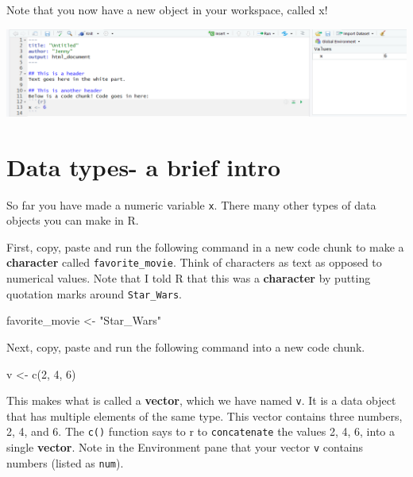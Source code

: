 \documentclass[
]{article}
\newenvironment{Shaded}{\begin{snugshade}}{\end{snugshade}}
\newcommand{\DecValTok}[1]{\textcolor[rgb]{0.00,0.00,0.81}{#1}}
\newcommand{\FunctionTok}[1]{\textcolor[rgb]{0.00,0.00,0.00}{#1}}
\newcommand{\NormalTok}[1]{#1}
\newcommand{\OtherTok}[1]{\textcolor[rgb]{0.56,0.35,0.01}{#1}}
\newcommand{\StringTok}[1]{\textcolor[rgb]{0.31,0.60,0.02}{#1}}
\begin{document}
\leavevmode\hypertarget{license}{}%
Note that you now have a new object in your workspace, called x!

\includegraphics[width=1\textwidth,height=\textheight]{figures/workspacex.png}

\hypertarget{data-types--a-brief-intro}{%
\section{Data types- a brief intro}\label{data-types--a-brief-intro}}

So far you have made a numeric variable \texttt{x}. There many other
types of data objects you can make in R.

First, copy, paste and run the following command in a new code chunk to
make a \textbf{character} called \texttt{favorite\_movie}. Think of
characters as text as opposed to numerical values. Note that I told R
that this was a \textbf{character} by putting quotation marks around
\texttt{Star\_Wars}.

\begin{Shaded}
\begin{Highlighting}[]
\NormalTok{favorite\_movie }\OtherTok{\textless{}{-}} \StringTok{"Star\_Wars"}
\end{Highlighting}
\end{Shaded}

Next, copy, paste and run the following command into a new code chunk.

\begin{Shaded}
\begin{Highlighting}[]
\NormalTok{v }\OtherTok{\textless{}{-}} \FunctionTok{c}\NormalTok{(}\DecValTok{2}\NormalTok{, }\DecValTok{4}\NormalTok{, }\DecValTok{6}\NormalTok{)}
\end{Highlighting}
\end{Shaded}

This makes what is called a \textbf{vector}, which we have named
\texttt{v}. It is a data object that has multiple elements of the same
type. This vector contains three numbers, 2, 4, and 6. The \texttt{c()}
function says to r to \texttt{concatenate} the values 2, 4, 6, into a
single \textbf{vector}. Note in the Environment pane that your vector
\texttt{v} contains numbers (listed as \texttt{num}).
\end{document}
